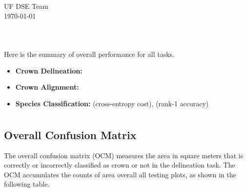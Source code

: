 \documentclass[]{report}   %
\begin{document}

\section*{{\color{blue}{\huge NEON NIST Data Science Evaluation\\ Report for }}}
{\large UF DSE Team}
\\
{\large \today}
\\\\
\section*{\color{blue}{Overall Performance}}
Here is the summary of overall performance for all tasks.
\begin{itemize} 
   \item[\checkmark] \textbf{Crown Delineation:} 
   \item[\checkmark] \textbf{Crown Alignment:} 
   \item[\checkmark] \textbf{Species Classification:} (cross-entropy cost), (rank-1 accuracy)
\end{itemize}






\newpage
\section*{\color{blue}{Task 1 - Crown Delineation}}
\subsection*{Overall Confusion Matrix}
The overall confusion matrix (OCM) measures the area in square meters that is correctly or incorrectly classified as crown or not in the delineation task. The OCM accumulates the counts of area overall all testing plots, as shown in the following table.\\
\end{document}
